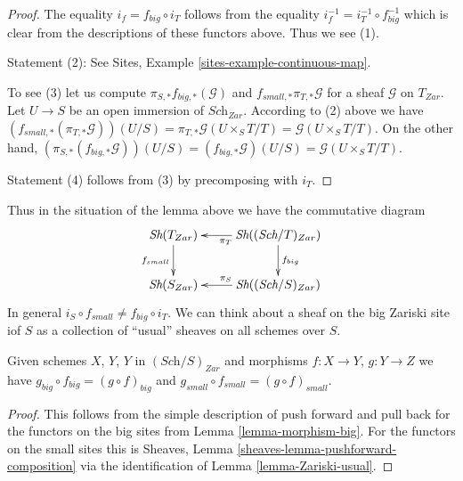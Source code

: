 \begin{proof}
The equality $i_f = f_{big} \circ i_T$ follows from the
equality $i_f^{-1} = i_T^{-1} \circ f_{big}^{-1}$ which is
clear from the descriptions of these functors above.
Thus we see (1).

\medskip\noindent
Statement (2): See Sites, Example \ref{sites-example-continuous-map}.

\medskip\noindent
To see (3) let us compute $\pi_{S, *}f_{big, *}(\mathcal{G})$ and
$f_{small, *} \pi_{T, *}\mathcal{G}$
for a sheaf $\mathcal{G}$ on $T_{Zar}$. Let $U \to S$ be an open
immersion of $\textit{Sch}_{Zar}$. According to
(2) above we have $(f_{small, *}(\pi_{T, *}\mathcal{G}))(U/S) =
\pi_{T, *}\mathcal{G}(U \times_S T/T) = \mathcal{G}(U\times_S T/T)$.
On the other hand,
$(\pi_{S, *}(f_{big, *}\mathcal{G}))(U/S) =
(f_{big, *}\mathcal{G})(U/S) =
\mathcal{G}(U\times_S T/T)$.

\medskip\noindent
Statement (4) follows from (3) by precomposing with $i_T$.
\end{proof}

\noindent
Thus in the situation of the lemma above we have the commutative diagram
$$
\xymatrix{
\textit{Sh}(T_{Zar}) \ar[d]_{f_{small}} &
\textit{Sh}((\textit{Sch}/T)_{Zar}) \ar[d]^{f_{big}} \ar[l]^{\pi_T}\\
\textit{Sh}(S_{Zar}) &
\textit{Sh}((\textit{Sch}/S)_{Zar}) \ar[l]_{\pi_S}
}
$$
In general $i_S \circ f_{small} \not = f_{big} \circ i_T$.
We can think about a sheaf on the big Zariski site iof $S$ as a collection
of ``usual'' sheaves on all schemes over $S$.

\begin{lemma}
\label{lemma-composition}
Given schemes $X$, $Y$, $Y$ in $(\textit{Sch}/S)_{Zar}$
and morphisms $f : X \to Y$, $g : Y \to Z$ we have
$g_{big} \circ f_{big} = (g \circ f)_{big}$ and
$g_{small} \circ f_{small} = (g \circ f)_{small}$.
\end{lemma}

\begin{proof}
This follows from the simple description of push forward
and pull back for the functors on the big sites from
Lemma \ref{lemma-morphism-big}. For the functors
on the small sites this is
Sheaves, Lemma \ref{sheaves-lemma-pushforward-composition}
via the identification of Lemma \ref{lemma-Zariski-usual}.
\end{proof}

